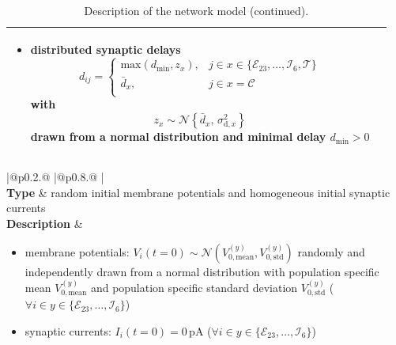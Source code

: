 \documentclass[10pt,a4paper,twoside,american]{article}
\theoremstyle{definitionstyle}
\begin{document}
\begin{table}
\begin{tabular}{
  |@{\hspace*{\marg}}p{}@{\hspace*{\marg}}
  |@{\hspace*{\marg}}p{}@{\hspace*{\marg}}
  |}
\begin{itemize}
  \item distributed synaptic delays
  \begin{equation*}
      d_{ij} = \begin{cases} 
	      \text{max}(d_\text{min},z_{x}), & j \in x\in\{\mathcal{E}_{23},\ldots,\mathcal{I}_{6},\mathcal{T}\} \\
      	\bar{d}_{x}, & j \in x=\mathcal{C} \\
      \end{cases}
  \end{equation*}
  with
  \begin{equation*}
      z_{x} \sim\mathcal{N}\left\{\bar{d}_{x},\,\sigma_{\text{d},x}^2\right\}
  \end{equation*}
  drawn from a normal distribution and minimal delay $d_\text{min} > 0$
  \end{itemize}\\
  \hline
\end{tabular}
\begin{tabular}{
  |@{\hspace*{\marg}}p{}@{\hspace*{\marg}}
  |@{\hspace*{\marg}}p{}@{\hspace*{\marg}}
  |}
  \hline
  \\
\hline
\textbf{Type} & random initial membrane potentials and homogeneous initial synaptic currents\\
\hline
  \textbf{Description} &
  \begin{itemize}
  \item membrane potentials:
	  $V_{i}(t=0)\sim\mathcal{N}(V_{0,\text{mean}}^{(y)},V_{0,\text{std}}^{(y)})$ randomly and independently drawn from a normal distribution with population specific mean $V_{0,\text{mean}}^{(y)}$ and population specific standard deviation $V_{0,\text{std}}^{(y)}$ ($\forall i \in y\in\{\mathcal{E}_{23},\ldots,\mathcal{I}_{6}\}$)
  \item synaptic currents: $I_{i}(t=0)=0\,\text{pA}$ ($\forall i \in y\in\{\mathcal{E}_{23},\ldots,\mathcal{I}_{6}\}$)
  \end{itemize}\\
  \hline
\end{tabular}
\caption{Description of the network model (continued).}
\end{table}
\clearpage
\end{document}
